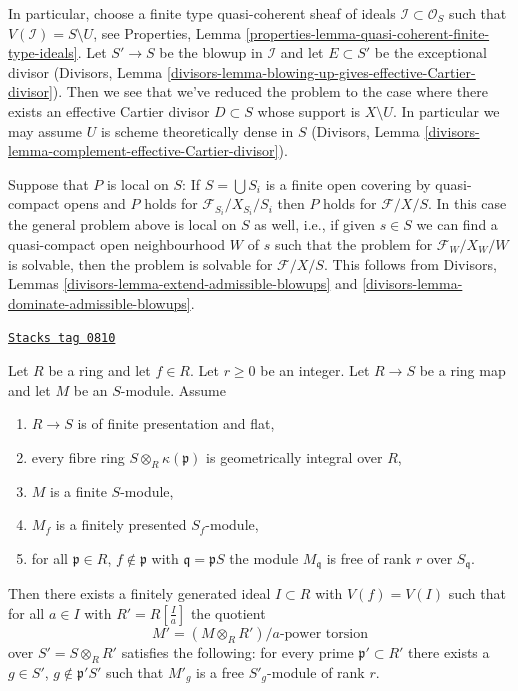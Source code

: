 \begin{remark}
\medskip\noindent
In particular, choose a finite type quasi-coherent sheaf of ideals
$\mathcal{I} \subset \mathcal{O}_S$ such that $V(\mathcal{I}) = S \setminus U$,
see Properties, Lemma \ref{properties-lemma-quasi-coherent-finite-type-ideals}.
Let $S' \to S$ be the blowup in $\mathcal{I}$ and let $E \subset S'$
be the exceptional divisor (Divisors, Lemma
\ref{divisors-lemma-blowing-up-gives-effective-Cartier-divisor}).
Then we see that we've reduced the
problem to the case where there exists an effective Cartier divisor
$D \subset S$ whose support is $X \setminus U$. In particular we may
assume $U$ is scheme theoretically dense in $S$
(Divisors, Lemma \ref{divisors-lemma-complement-effective-Cartier-divisor}).

\medskip\noindent
Suppose that $P$ is local on $S$: If $S = \bigcup S_i$ is a finite open
covering by quasi-compact opens and $P$ holds for
$\mathcal{F}_{S_i}/X_{S_i}/S_i$ then $P$ holds for $\mathcal{F}/X/S$.
In this case the general problem above is local on $S$ as well, i.e.,
if given $s \in S$ we can find a quasi-compact open neighbourhood $W$ of $s$
such that the problem for $\mathcal{F}_W/X_W/W$ is solvable, then the
problem is solvable for $\mathcal{F}/X/S$. This follows from
Divisors, Lemmas \ref{divisors-lemma-extend-admissible-blowups} and
\ref{divisors-lemma-dominate-admissible-blowups}.
\end{remark}

\begin{lemma}
\label{flat-lemma-helper-blowup-affine-space}
\href{https://stacks.math.columbia.edu/tag/0810}{\texttt{Stacks tag 0810}}

Let $R$ be a ring and let $f \in R$. Let $r\geq 0$ be an integer.
Let $R \to S$ be a ring map and let $M$ be an $S$-module. Assume
\begin{enumerate}
\item $R \to S$ is of finite presentation and flat,
\item every fibre ring $S \otimes_R \kappa(\mathfrak p)$ is
geometrically integral over $R$,
\item $M$ is a finite $S$-module,
\item $M_f$ is a finitely presented $S_f$-module,
\item for all $\mathfrak p \in R$, $f \not \in \mathfrak p$ with
$\mathfrak q = \mathfrak pS$ the module $M_{\mathfrak q}$ is free
of rank $r$ over $S_\mathfrak q$.
\end{enumerate}
Then there exists a finitely generated ideal $I \subset R$ with
$V(f) = V(I)$ such that for all $a \in I$ with $R' = R[\frac{I}{a}]$
the quotient
$$
M' = (M \otimes_R R')/a\text{-power torsion}
$$
over $S' = S \otimes_R R'$ satisfies the following: for every prime
$\mathfrak p' \subset R'$ there exists a $g \in S'$,
$g \not \in \mathfrak p'S'$ such that $M'_g$ is a free $S'_g$-module
of rank $r$.
\end{lemma}

